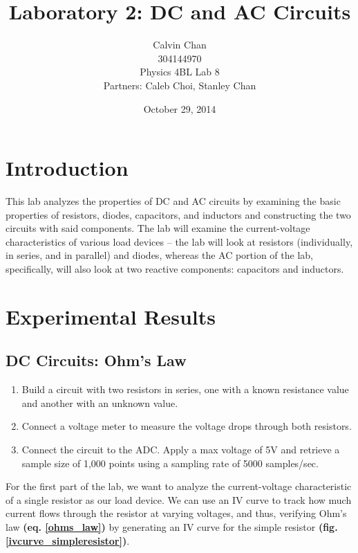 \documentclass{article}
\begin{document}
\title{Laboratory 2: DC and AC Circuits}
\date{October 29, 2014}
\author{Calvin Chan\\304144970\\Physics 4BL Lab 8\\Partners: Caleb Choi, Stanley
Chan}

\maketitle

\section{Introduction}
This lab analyzes the properties of DC and AC circuits by examining the basic
properties of resistors, diodes, capacitors, and inductors and constructing the
two circuits with said components. The lab will examine the current-voltage
characteristics of various load devices – the lab will look at resistors
(individually, in series, and in parallel) and diodes, whereas the AC portion of
the lab, specifically, will also look at two reactive components: capacitors and
inductors.

\section{Experimental Results}

\subsection{DC Circuits: Ohm's Law}

\begin{enumerate}
    \item Build a circuit with two resistors in series, one with a known
    resistance value and another with an unknown value.
    \item Connect a voltage meter to measure the voltage drops through both
    resistors.
    \item Connect the circuit to the ADC. Apply a max voltage of 5V and retrieve
    a sample size of 1,000 points using a sampling rate of 5000 samples/sec.
\end{enumerate}

For the first part of the lab, we want to analyze the current-voltage
characteristic of a single resistor as our load device. We can use an IV curve
to track how much current flows through the resistor at varying voltages, and
thus, verifying Ohm's law \textbf{(eq. \ref{ohms_law})} by generating an IV
curve for the simple resistor \textbf{(fig. \ref{ivcurve_simpleresistor})}. 
\end{document}
